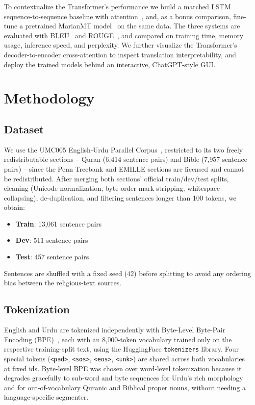 \documentclass[conference]{IEEEtran}
\begin{document}
To contextualize the Transformer's performance we build a matched LSTM
sequence-to-sequence baseline with attention~\cite{bahdanau2015neural,
luong2015effective}, and, as a bonus comparison, fine-tune a pretrained
MarianMT model~\cite{junczysdowmunt2018opus,tiedemann2020opus} on the same
data. The three systems are evaluated with BLEU~\cite{papineni2002bleu} and
ROUGE~\cite{lin2004rouge}, and compared on training time, memory usage,
inference speed, and perplexity. We further visualize the Transformer's
decoder-to-encoder cross-attention to inspect translation interpretability,
and deploy the trained models behind an interactive, ChatGPT-style GUI.

\section{Methodology}

\subsection{Dataset}
We use the UMC005 English-Urdu Parallel Corpus~\cite{umc005}, restricted to
its two freely redistributable sections -- Quran (6{,}414 sentence pairs)
and Bible (7{,}957 sentence pairs) -- since the Penn Treebank and EMILLE
sections are licensed and cannot be redistributed. After merging both
sections' official train/dev/test splits, cleaning (Unicode normalization,
byte-order-mark stripping, whitespace collapsing), de-duplication, and
filtering sentences longer than 100 tokens, we obtain:
\begin{itemize}
    \item \textbf{Train}: 13{,}061 sentence pairs
    \item \textbf{Dev}: 511 sentence pairs
    \item \textbf{Test}: 457 sentence pairs
\end{itemize}
Sentences are shuffled with a fixed seed (42) before splitting to avoid any
ordering bias between the religious-text sources.

\subsection{Tokenization}
English and Urdu are tokenized independently with Byte-Level Byte-Pair
Encoding (BPE)~\cite{sennrich2016neural}, each with an 8{,}000-token
vocabulary trained only on the respective training-split text, using the
HuggingFace \texttt{tokenizers} library. Four special tokens
(\texttt{<pad>}, \texttt{<sos>}, \texttt{<eos>}, \texttt{<unk>}) are shared
across both vocabularies at fixed ids. Byte-level BPE was chosen over
word-level tokenization because it degrades gracefully to sub-word and
byte sequences for Urdu's rich morphology and for out-of-vocabulary Quranic
and Biblical proper nouns, without needing a language-specific segmenter.
\end{document}
